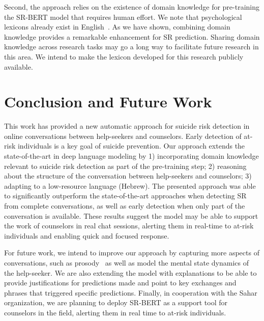 \documentclass[letterpaper]{article} %
\begin{document}
Second,  the approach relies on the existence of domain knowledge for pre-training the SR-BERT model that requires human effort. 
We note that  psychological lexicons already exist in English~\cite{lee2020cross}. As we have shown, combining  domain knowledge provides a remarkable enhancement for SR prediction. Sharing domain knowledge across research tasks may go a long way to facilitate future research in this area. We intend to make the lexicon developed for this research publicly available.
\section{Conclusion and Future Work}
This work has provided a new automatic approach for suicide risk detection in online conversations between help-seekers and counselors. Early detection of at-risk individuals is a key goal of suicide prevention. 
Our approach extends the state-of-the-art in deep language modeling by 1) incorporating domain knowledge relevant to suicide risk detection as part of the pre-training step; 2) reasoning about the structure of the conversation between help-seekers and counselors; 3) adapting to a low-resource language (Hebrew). 
The presented approach was able to  significantly outperform the state-of-the-art approaches when detecting SR from complete conversations, as well as early detection when only part of the conversation is available. 
These results suggest the model may be able to support the work of counselors in real chat sessions, alerting them in real-time to at-risk individuals and enabling quick and focused response. 

For future work, we intend to improve our approach by capturing more aspects of conversations, such as prosody~\cite{wilson2006relevance, kliper2010evidence} as well as model the mental state dynamics of the help-seeker.
We are also extending the model with  explanations to be able to provide justifications for predictions made and point to key exchanges and phrases that triggered specific predictions. 
Finally, in cooperation with the Sahar organization, we are planning to deploy SR-BERT as a support tool for counselors in the field, alerting them in real time to at-risk individuals.
\end{document}
